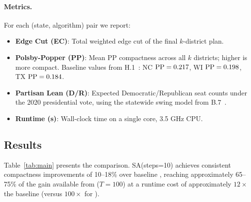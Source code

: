 \paragraph{Metrics.}
For each (state, algorithm) pair we report:
\begin{itemize}
\item \textbf{Edge Cut (EC)}: Total weighted edge cut of the final $k$-district plan.
\item \textbf{Polsby-Popper (PP)}: Mean PP compactness across all $k$ districts;
  higher is more compact.
  Baseline values from H.1~\citep{h1paper}: NC $\mathrm{PP}=0.217$, WI $\mathrm{PP}=0.198$,
  TX $\mathrm{PP}=0.184$.
\item \textbf{Partisan Lean (D/R)}: Expected Democratic/Republican seat counts
  under the 2020 presidential vote, using the statewide swing model from B.7~\citep{b7paper}.
\item \textbf{Runtime (s)}: Wall-clock time on a single core, 3.5 GHz CPU.
\end{itemize}

\subsection{Results}

Table~\ref{tab:main} presents the comparison.
SA(steps=10) achieves consistent compactness improvements of 10--18\% over
baseline \metis{}, reaching approximately 65--75\% of the gain available from
\be{}($T=100$) at a runtime cost of approximately $12\times$ the baseline
(versus $100\times$ for \be{}).

